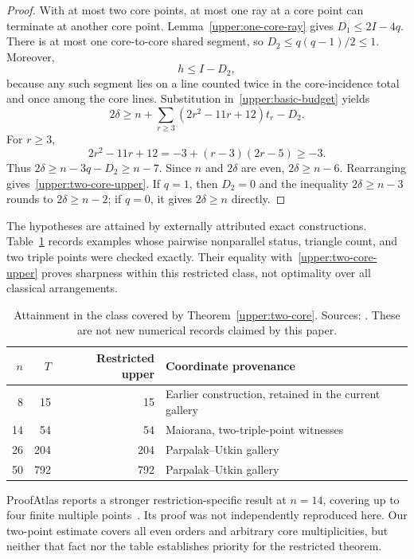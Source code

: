 \begin{proof}
With at most two core points, at most one ray at a core point can terminate at another core point. Lemma~\ref{upper:one-core-ray} gives $D_1\le2I-4q$. There is at most one core-to-core shared segment, so $D_2\le q(q-1)/2\le1$. Moreover,
\[
 h\le I-D_2,
\]
because any such segment lies on a line counted twice in the core-incidence total and once among the core lines. Substitution in~\eqref{upper:basic-budget} yields
\[
 2\delta\ge n+\sum_{r\ge3}(2r^2-11r+12)t_r-D_2.
\]
For $r\ge3$,
\[
 2r^2-11r+12=-3+(r-3)(2r-5)\ge-3.
\]
Thus $2\delta\ge n-3q-D_2\ge n-7$. Since $n$ and $2\delta$ are even, $2\delta\ge n-6$. Rearranging gives~\eqref{upper:two-core-upper}. If $q=1$, then $D_2=0$ and the inequality $2\delta\ge n-3$ rounds to $2\delta\ge n-2$; if $q=0$, it gives $2\delta\ge n$ directly.
\end{proof}

The hypotheses are attained by externally attributed exact constructions. Table~\ref{upper:restricted-attainment} records examples whose pairwise nonparallel status, triangle count, and two triple points were checked exactly. Their equality with~\eqref{upper:two-core-upper} proves sharpness within this restricted class, not optimality over all classical arrangements.

\begin{table}[htbp]
\centering\small
\begin{tabular}{@{}rrrl@{}}
\toprule
$n$ & $T$ & Restricted upper & Coordinate provenance\\
\midrule
8 & 15 & 15 & Earlier construction, retained in the current gallery\\
14 & 54 & 54 & Maiorana, two-triple-point witnesses\\
26 & 204 & 204 & Parpalak--Utkin gallery\\
50 & 792 & 792 & Parpalak--Utkin gallery\\
\bottomrule
\end{tabular}
\caption{Attainment in the class covered by Theorem~\ref{upper:two-core}. Sources: \citet{maiorana2026,parpalakutkinGallery2026}. These are not new numerical records claimed by this paper.}
\label{upper:restricted-attainment}
\end{table}

ProofAtlas reports a stronger restriction-specific result at $n=14$, covering up to four finite multiple points~\citep{proofatlas2026}. Its proof was not independently reproduced here. Our two-point estimate covers all even orders and arbitrary core multiplicities, but neither that fact nor the table establishes priority for the restricted theorem.

